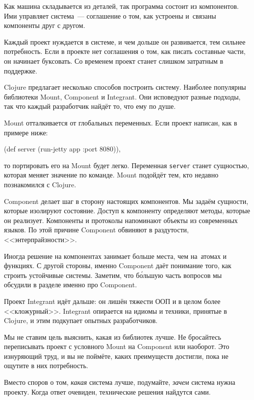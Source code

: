 Как машина складывается из деталей, так программа состоит из компонентов. Ими
управляет система~--- соглашение о том, как устроены и~связаны компоненты друг с
другом.

Каждый проект нуждается в системе, и чем дольше он развивается, тем сильнее
потребность. Если в проекте нет соглашения о том, как писать составные части, он
начинает буксовать. Со временем проект станет слишком затратным в поддержке.

Clojure предлагает несколько способов построить систему. Наиболее популярны
библиотеки Mount, Component и Integrant. Они исповедуют разные подходы, так что
каждый разработчик найдёт то, что ему по душе.

Mount отталкивается от глобальных переменных. Если проект написан, как в примере
ниже:

\begin{english}
  \begin{clojure}
(def server (run-jetty app {:port 8080})),
  \end{clojure}
\end{english}

\noindent
то портировать его на Mount будет легко. Переменная \verb|server| станет
сущностью, которая меняет значение по команде. Mount подойдёт тем, кто недавно
познакомился с Clojure.

Component делает шаг в сторону настоящих компонентов. Мы задаём сущности, которые
изолируют состояние. Доступ к компоненту определяют методы, которые он
реализует. Компоненты и протоколы напоминают объекты из современных языков. По
этой причине Component обвиняют в раздутости, <<энтерпрайзности>>.

Иногда решение на компонентах занимает больше места, чем на~атомах и функциях. С
другой стороны, именно Component даёт понимание того, как строить устойчивые
системы. Заметим, что б\'{о}льшую часть вопросов мы обсудили в разделе именно
про Component.

Проект Integrant идёт дальше: он лишён тяжести ООП и в целом более
<<кложурный>>. Integrant опирается на идиомы и техники, принятые в Clojure, и
этим подкупает опытных разработчиков.

Мы не ставим цель выяснить, какая из библиотек лучше. Не бросайтесь переписывать
проект с условного Mount на Component или наоборот. Это изнуряющий труд, и вы не
поймёте, каких преимуществ достигли, пока не ощутите в них потребность.

Вместо споров о том, \emph{какая} система лучше, подумайте, \emph{зачем} система
нужна проекту. Когда ответ очевиден, технические решения найдутся сами.
